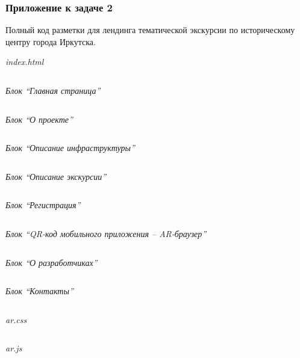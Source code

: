 \subsubsection*{Приложение к задаче 2}

Полный код разметки для лендинга тематической экскурсии по историческому центру города Иркутска.

\textit{index.html}

\inputminted[fontsize=\footnotesize, linenos]{html}{final/command_tour/ar/task_02/index.html}

\textit{Блок “Главная страница”}

\inputminted[fontsize=\footnotesize, linenos]{html}{final/command_tour/ar/task_02/main.html}

\textit{Блок “О проекте”}

\inputminted[fontsize=\footnotesize, linenos]{html}{final/command_tour/ar/task_02/about.html}

\textit{Блок “Описание инфраструктуры”}

\inputminted[fontsize=\footnotesize, linenos]{html}{final/command_tour/ar/task_02/infrastructure.html}

\textit{Блок “Описание экскурсии”}

\inputminted[fontsize=\footnotesize, linenos]{html}{final/command_tour/ar/task_02/quests.html}

\textit{Блок “Регистрация”}

\inputminted[fontsize=\footnotesize, linenos]{html}{final/command_tour/ar/task_02/registration.html}

\textit{Блок “QR-код мобильного приложения – AR-браузер”}

\inputminted[fontsize=\footnotesize, linenos]{html}{final/command_tour/ar/task_02/application.html}

\textit{Блок “О разработчиках”}

\inputminted[fontsize=\footnotesize, linenos]{html}{final/command_tour/ar/task_02/developers.html}

\textit{Блок “Контакты”}

\inputminted[fontsize=\footnotesize, linenos]{html}{final/command_tour/ar/task_02/contact.html}

\textit{ar.css}

\inputminted[fontsize=\footnotesize, linenos]{css}{final/command_tour/ar/task_02/ar.css}

\textit{ar.js}

\inputminted[fontsize=\footnotesize, linenos]{javascript}{final/command_tour/ar/task_02/ar.js}

